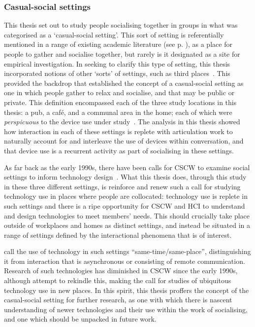 \begin{corrections}
\subsubsection{Casual-social settings}\label{sec:synopsis conclusions concept casual-social}
This thesis set out to study people socialising together in groups in what was categorised as a `casual-social setting'.
This sort of setting is referentially mentioned in a range of existing academic literature (see p. \pageref{line:casualsocial}), as a place for people to gather and socialise together, but rarely is it designated as a site for empirical investigation.
In seeking to clarify this type of setting, this thesis incorporated notions of other `sorts' of settings, such as third places~\citep{Oldenburg1989}.
This provided the backdrop that established the concept of a casual-social setting as one in which people gather to relax and socialise, and that may be public or private.
This definition encompassed each of the three study locations in this thesis: a pub, a caf\'{e}, and a communal area in the home; each of which were \textit{perspicuous} to the device use under study~\citep{Garfinkel1992}.
The analysis in this thesis showed how interaction in each of these settings is replete with articulation work to naturally account for and interleave the use of devices within conversation, and that device use is a recurrent activity as part of socialising in these settings.

As far back as the early 1990s, there have been calls for \ac{CSCW} to examine social settings to inform technology design~\citep{Grudin1990}.
What this thesis does, through this study in these three different settings, is reinforce and renew such a call for studying technology use in places where people are collocated: technology use is replete in such settings and there is a ripe opportunity for \ac{CSCW} and \ac{HCI} to understand and design technologies to meet members' needs.
This should crucially take place outside of workplaces and homes as distinct settings, and instead be situated in a range of settings defined by the interactional phenomena that is of interest.

\citet{Ellis1991} call the use of technology in such settings ``same-time/same-place'', distinguishing it from interaction that is asynchronous or consisting of remote communication.
Research of such technologies has diminished in \ac{CSCW} since the early 1990s, although \citet{Fischer2016} attempt to rekindle this, making the call for studies of ubiquitous technology use in new places.
In this spirit, this thesis proffers the concept of the casual-social setting for further research, as one with which there is nascent understanding of newer technologies and their use within the work of socialising, and one which should be unpacked in future work.


\end{corrections}
